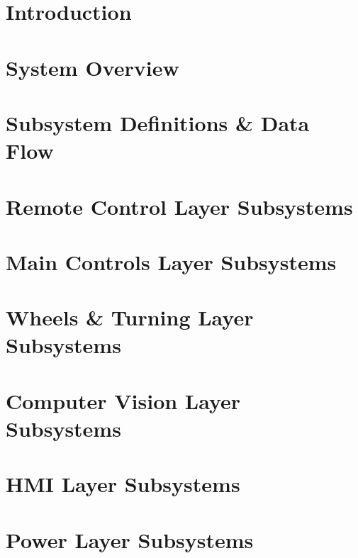 \documentclass[11pt,letterpaper]{article}
\begin{document}
\section{Introduction}

\newpage
\section{System Overview}

\newpage
\section{Subsystem Definitions \& Data Flow}

\newpage
\section{Remote Control Layer Subsystems}

\newpage
\section{Main Controls Layer Subsystems}

\newpage
\section{Wheels \& Turning Layer Subsystems}

\newpage
\section{Computer Vision Layer Subsystems}

\newpage
\section{HMI Layer Subsystems}

\newpage
\section{Power Layer Subsystems}

\newpage



{}
\end{document}
